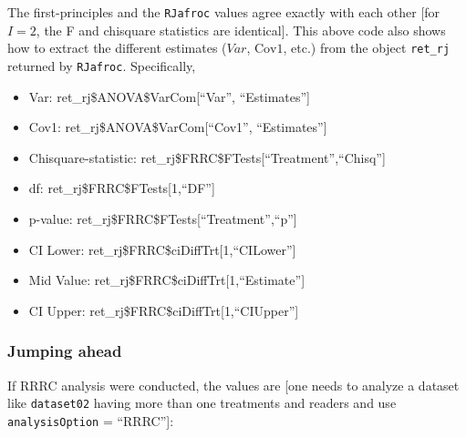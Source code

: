 \documentclass[
]{book}
\providecommand{\tightlist}{%
  \setlength{\itemsep}{0pt}\setlength{\parskip}{0pt}}
\begin{document}
The first-principles and the \texttt{RJafroc} values agree exactly with each other {[}for \(I = 2\), the F and chisquare statistics are identical{]}. This above code also shows how to extract the different estimates (\(Var\), \(\text{Cov1}\), etc.) from the object \texttt{ret\_rj} returned by \texttt{RJafroc}. Specifically,

\begin{itemize}
\tightlist
\item
  Var: ret\_rj\$ANOVA\$VarCom{[}``Var'', ``Estimates''{]}
\item
  Cov1: ret\_rj\$ANOVA\$VarCom{[}``Cov1'', ``Estimates''{]}
\item
  Chisquare-statistic: ret\_rj\$FRRC\$FTests{[}``Treatment'',``Chisq''{]}
\item
  df: ret\_rj\$FRRC\$FTests{[}1,``DF''{]}
\item
  p-value: ret\_rj\$FRRC\$FTests{[}``Treatment'',``p''{]}
\item
  CI Lower: ret\_rj\$FRRC\$ciDiffTrt{[}1,``CILower''{]}
\item
  Mid Value: ret\_rj\$FRRC\$ciDiffTrt{[}1,``Estimate''{]}
\item
  CI Upper: ret\_rj\$FRRC\$ciDiffTrt{[}1,``CIUpper''{]}
\end{itemize}

\hypertarget{jumping-ahead}{%
\subsubsection{Jumping ahead}\label{jumping-ahead}}

If RRRC analysis were conducted, the values are {[}one needs to analyze a dataset like \texttt{dataset02} having more than one treatments and readers and use \texttt{analysisOption} = ``RRRC''{]}:
\end{document}
